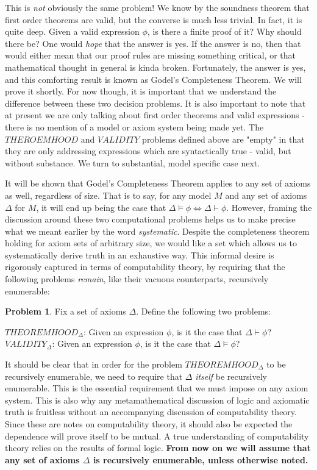 \documentclass{article}
\theoremstyle{definition}
\newtheorem{problem}{Problem}
\theoremstyle{plain}
\theoremstyle{theorem}
\begin{document}
This is \textit{not} obviously the same problem! We know by the soundness theorem that first order theorems are valid, but the converse is much less trivial. In fact, it is quite deep. Given a valid expression $\phi$, is there a finite proof of it? Why should there be? One would \textit{hope} that the answer is yes. If the answer is no, then that would either mean that our proof rules are missing something critical, or that mathematical thought in general is kinda broken. Fortunately, the answer is yes, and this comforting result is known as Godel's Completeness Theorem. We will prove it shortly. For now though, it is important that we understand the difference between these two decision problems. It is also important to note that at present we are only talking about first order theorems and valid expressions - there is no mention of a model or axiom system being made yet. The $THEROEMHOOD$ and $VALIDITY$ problems defined above are "empty" in that they are only addressing expressions which are syntactically true - valid, but without substance. We turn to substantial, model specific case next.
\par It will be shown that Godel's Completeness Theorem applies to any set of axioms as well, regardless of size. That is to say, for any model $M$ and any set of axioms $\Delta$ for $M$, it will end up being the case that $\Delta \models \phi \iff \Delta \vdash \phi$. However, framing the discussion around these two computational problems helps us to make precise what we meant earlier by the word \textit{systematic}. Despite the completeness theorem holding for axiom sets of arbitrary size, we would like a set which allows us to systematically derive truth in an exhaustive way. This informal desire is rigorously captured in terms of computability theory, by requiring that the following problems \textit{remain}, like their vacuous counterparts, recursively enumerable:
\begin{problem}
    Fix a set of axioms $\Delta$. Define the following two problems:
    \begin{center}
        $THEOREMHOOD_{\Delta}$: Given an expression $\phi$, is it the case that $\Delta \vdash \phi$? \\
        $VALIDITY_{\Delta}$: Given an expression $\phi$, is it the case that $\Delta \models \phi$?
    \end{center}
\end{problem}
It should be clear that in order for the problem $THEOREMHOOD_{\Delta}$ to be recursively enumerable, we need to require that $\Delta$ \textit{itself} be recursively enumerable. This is the essential requirement that we must impose on any axiom system. This is also why any metamathematical discussion of logic and axiomatic truth is fruitless without an accompanying discussion of computability theory. Since these are notes on computability theory, it should also be expected the dependence will prove itself to be mutual. A true understanding of computability theory relies on the results of formal logic. \textbf{From now on we will assume that any set of axioms $\Delta$ is recursively enumerable, unless otherwise noted.}
\end{document}

